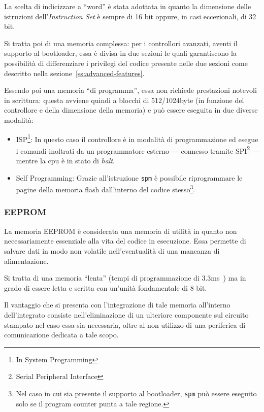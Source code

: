 La scelta di indicizzare a ``word'' è stata adottata in quanto la dimensione delle istruzioni dell'\textit{Instruction Set} è sempre di 16 bit oppure, in casi eccezionali, di 32 bit\cite{avr:isa}.

Si tratta poi di una memoria complessa: per i controllori avanzati, aventi il supporto al bootloader, essa è divisa in due sezioni le quali garantiscono la possibilità di differenziare i privilegi del codice presente nelle due sezioni come descritto nella sezione~\ref{ss:advanced-features}.

Essendo poi una memoria ``di programma'', essa non richiede prestazioni notevoli in scrittura: questa avviene quindi a blocchi di 512/1024byte (in funzione del controllore e della dimensione della memoria) e può essere eseguita in due diverse modalità:
\begin{itemize}
    \item ISP\footnote{In System Programming}: In questo caso il controllore è in modalità di programmazione ed esegue i comandi inoltrati da un programmatore esterno --- connesso tramite SPI\footnote{Serial Peripheral Interface} --- mentre la cpu è in stato di \textit{halt}.
    \item Self Programming: Grazie all'istruzione \texttt{spm} è possibile riprogrammare le pagine della memoria flash dall'interno del codice stesso\footnote{Nel caso in cui sia presente il supporto al bootloader, \texttt{spm} può essere eseguito solo se il program counter punta a tale regione.}.
\end{itemize}

\subsubsection{EEPROM}

La memoria EEPROM è considerata una memoria di utilità in quanto non necessariamente essenziale alla vita del codice in esecuzione. Essa permette di salvare dati in modo non volatile nell'eventualità di una mancanza di alimentazione.

Si tratta di una memoria ``lenta'' (tempi di programmazione di 3.3ms~\cite{avr:m328p}) ma in grado di essere letta e scritta con un'unità fondamentale di 8 bit.

Il vantaggio che si presenta con l'integrazione di tale memoria all'interno dell'integrato consiste nell'eliminazione di un ulteriore componente sul circuito stampato nel caso essa sia necessaria, oltre al non utilizzo di una periferica di comunicazione dedicata a tale scopo.

